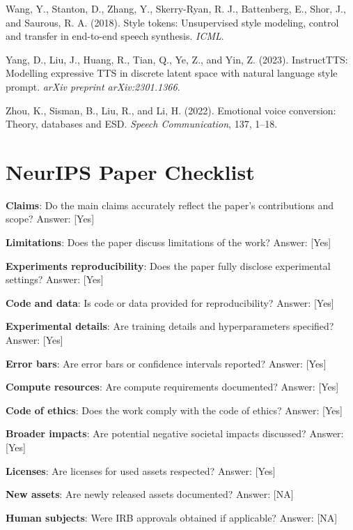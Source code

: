 \documentclass{article}
\begin{document}
Wang, Y., Stanton, D., Zhang, Y., Skerry-Ryan, R. J., Battenberg, E., Shor, J., and Saurous, R. A. (2018). Style tokens: Unsupervised style modeling, control and transfer in end-to-end speech synthesis. \textit{ICML}.

Yang, D., Liu, J., Huang, R., Tian, Q., Ye, Z., and Yin, Z. (2023). InstructTTS: Modelling expressive TTS in discrete latent space with natural language style prompt. \textit{arXiv preprint arXiv:2301.1366}.

Zhou, K., Sisman, B., Liu, R., and Li, H. (2022). Emotional voice conversion: Theory, databases and ESD. \textit{Speech Communication}, 137, 1--18.

\section{NeurIPS Paper Checklist}

\label{sec:neurips_paper_checklist}

\textbf{Claims}: Do the main claims accurately reflect the paper's contributions and scope?
Answer: [Yes]

\textbf{Limitations}: Does the paper discuss limitations of the work?
Answer: [Yes]

\textbf{Experiments reproducibility}: Does the paper fully disclose experimental settings?
Answer: [Yes]

\textbf{Code and data}: Is code or data provided for reproducibility?
Answer: [Yes]

\textbf{Experimental details}: Are training details and hyperparameters specified?
Answer: [Yes]

\textbf{Error bars}: Are error bars or confidence intervals reported?
Answer: [Yes]

\textbf{Compute resources}: Are compute requirements documented?
Answer: [Yes]

\textbf{Code of ethics}: Does the work comply with the code of ethics?
Answer: [Yes]

\textbf{Broader impacts}: Are potential negative societal impacts discussed?
Answer: [Yes]

\textbf{Licenses}: Are licenses for used assets respected?
Answer: [Yes]

\textbf{New assets}: Are newly released assets documented?
Answer: [NA]

\textbf{Human subjects}: Were IRB approvals obtained if applicable?
Answer: [NA]
\end{document}
